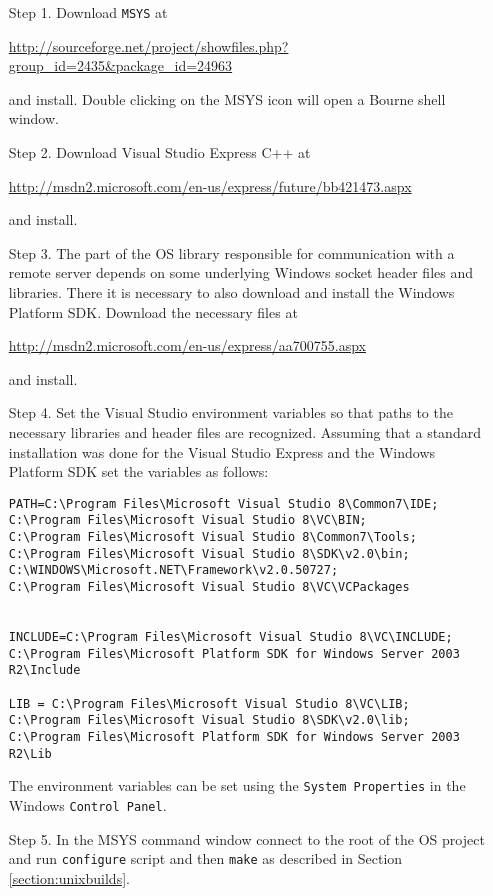 \documentclass[11pt]{article}
\renewcommand{\_}{{\char"5F}}
\renewcommand{\{}{{\char"7B}}
\renewcommand{\}}{{\char"7D}}
\renewcommand{\^}{{\char"0D}}
\renewcommand{\'}{{\char"0D}}
\begin{document}
\begin{itemize}

\item[Step 1.] Download {\tt MSYS} at

\begin{center}
\url{http://sourceforge.net/project/showfiles.php?group_id=2435&package_id=24963}
\end{center}

and install.  Double clicking on the MSYS icon will open a Bourne shell window.

\item[Step 2.]  Download  Visual Studio Express C++ at

 \url{http://msdn2.microsoft.com/en-us/express/future/bb421473.aspx}

and install.

 \item[Step 3.]  The part of the OS library responsible for communication with a remote server depends on some underlying Windows socket header files and libraries. There it is necessary to also download and install the Windows Platform SDK. Download the necessary files at

 \url{http://msdn2.microsoft.com/en-us/express/aa700755.aspx}

 and install.

\item[Step 4.]   Set the Visual Studio environment variables so that paths to the necessary libraries and header files  are recognized.  Assuming that a standard installation was done for the Visual Studio Express and the Windows Platform SDK set the variables as follows:

\begin{verbatim}
PATH=C:\Program Files\Microsoft Visual Studio 8\Common7\IDE;
C:\Program Files\Microsoft Visual Studio 8\VC\BIN;
C:\Program Files\Microsoft Visual Studio 8\Common7\Tools;
C:\Program Files\Microsoft Visual Studio 8\SDK\v2.0\bin;
C:\WINDOWS\Microsoft.NET\Framework\v2.0.50727;
C:\Program Files\Microsoft Visual Studio 8\VC\VCPackages


INCLUDE=C:\Program Files\Microsoft Visual Studio 8\VC\INCLUDE;
C:\Program Files\Microsoft Platform SDK for Windows Server 2003 R2\Include

LIB = C:\Program Files\Microsoft Visual Studio 8\VC\LIB;
C:\Program Files\Microsoft Visual Studio 8\SDK\v2.0\lib;
C:\Program Files\Microsoft Platform SDK for Windows Server 2003 R2\Lib
\end{verbatim}

The environment variables can be set using the {\tt System Properties} in the Windows {\tt Control Panel}.


\item[Step 5.]  In the MSYS command window connect to the root of the OS project and run  {\tt configure}  script  and then {\tt make} as described in Section \ref{section:unixbuilds}.

\end{itemize}
\end{document}
